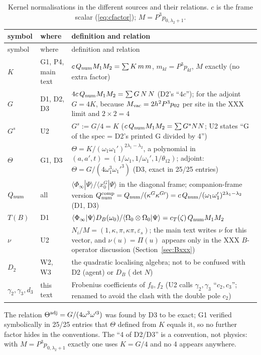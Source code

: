 \documentclass[11pt]{article}
\begin{document}
{\small
\begin{longtable}{p{2.3cm}p{4.6cm}p{7cm}}
\caption{Kernel normalisations in the different sources and their relations. $c$ is the frame scalar (\ref{eq:cfactor}); $M=P^3p_{0,\lambda_2+1}$.}\label{tab:norms}\\
\toprule
symbol & where & definition and relation \\
\midrule
\endfirsthead
\toprule
symbol & where & definition and relation \\
\midrule
\endhead
\bottomrule
\endlastfoot
$K$ & G1, P4, main text & $c\,Q_{\rm num}M_1M_2=\sum K\,m\,m$, $m_{kl}=P^3p_{kl}$, $M$ exactly (no extra factor) \\
$G$ & D1, D2, D3 & $4c\,Q_{\rm num}M_1M_2=\sum G\,N\,N$ (D2's ``$4c$''); for the adjoint $G=4K$, because $M_{\rm vac}=2h^2P^3p_{02}$ per site in the XXX limit and $2\times2=4$ \\
$G^s$ & U2 & $G^s:=G/4=K$ ($c\,Q_{\rm num}M_1M_2=\sum G^sNN$; U2 states ``G of the spec = D2's printed G divided by 4'') \\
$\Theta$ & G1, D3 & $\Theta=K/(\omega_1\omega_1')^{2\lambda_1-\lambda_2}$, a polynomial in $(a,a',t)=(1/\omega_1,1/\omega_1',1/\theta_{12})$; adjoint: $\Theta=G/(4\omega_1^3\omega_1'^3)$ (D3, exact in 25/25 entries) \\
$Q_{\rm num}$ & all & $\langle\Phi_\infty|\Psi\rangle/\langle x_0^G|\Psi\rangle$ in the diagonal frame; companion-frame version $Q_{\rm num}^{\rm comp}=Q_{\rm num}/(\kappa^G\kappa^{G\prime})=c\,Q_{\rm num}/(\omega_1\omega_1')^{2\lambda_1-\lambda_2}$ (D1, D3) \\
$T(B)$ & D1 & $\langle\Phi_\infty|\Psi\rangle D_B(\omega_0)/\langle\Omega_0\otimes\Omega_0|\Psi\rangle=c_T(\zeta)\,Q_{\rm num}M_1M_2$ \\
$\nu$ & U2 & $N_i/M=(1,\kappa,\pi,\kappa\pi,\varepsilon_s)$; the main text writes $\nu$ for this vector, and $\nu(u)=\Pi(u)$ appears only in the XXX $B$-operator discussion (Section~\ref{sec:Bxxx}) \\
$D_2$ & W2, W3 & the quadratic localising algebra; not to be confused with D2 (agent) or $D_B$ ($\det N$) \\
$\gamma_2,\gamma_3,d_3$ & this text & Frobenius coefficients of $f_0,f_2$ (U2 calls $\gamma_2,\gamma_3$ ``$c_2,c_3$''; renamed to avoid the clash with the double pole $c_2$) \\
\end{longtable}}


The relation $\Theta^{\rm adj}=G/(4\omega^3\omega'^3)$ was found by D3 to be exact; G1 verified symbolically in 25/25 entries that $\Theta$ defined from $K$ equals it, so no further factor hides in the conventions.
The ``4 of D2/D3'' is a convention, not physics: with $M=P^3p_{0,\lambda_2+1}$ exactly one uses $K=G/4$ and no 4 appears anywhere.
\end{document}
